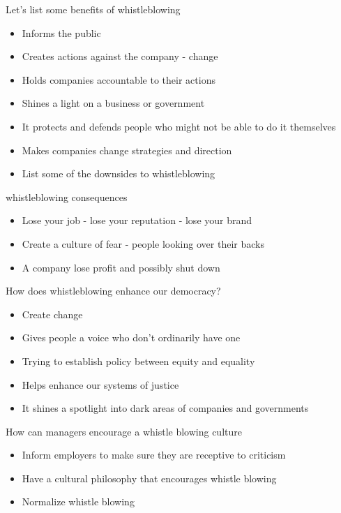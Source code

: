 \documentclass[11pt]{article}
\begin{document}
Let's list some benefits of whistleblowing

\begin{itemize}
    \item Informs the public 
    \item Creates actions against the company - change
    \item Holds companies accountable to their actions
    \item Shines a light on a business or government
    \item It protects and defends people who might not be able to do it themselves
    \item Makes companies change strategies and direction
    \item List some of the downsides to whistleblowing
\end{itemize}

whistleblowing consequences

\begin{itemize}
    \item Lose your job - lose your reputation - lose your brand
    \item Create a culture of fear - people looking over their backs
    \item A company lose profit and possibly shut down
\end{itemize}

How does whistleblowing enhance our democracy?

\begin{itemize}
    \item Create change
    \item Gives people a voice who don't ordinarily have one
    \item Trying to establish policy between equity and equality
    \item Helps enhance our systems of justice
    \item It shines a spotlight into dark areas of companies and governments
\end{itemize}

How can managers encourage a whistle blowing culture

\begin{itemize}
    \item Inform employers to make sure they are receptive to criticism
    \item Have a cultural philosophy that encourages whistle blowing
    \item Normalize whistle blowing
\end{itemize}
\end{document}
